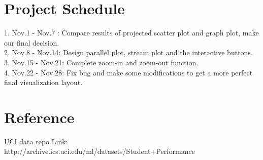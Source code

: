 \documentclass{article}
\begin{document}
\section{Project Schedule}
1. Nov.1 - Nov.7 : Compare results of projected scatter plot and graph plot, make our final decision.\\
2. Nov.8 - Nov.14: Design parallel plot,  stream plot and the interactive buttons.\\ 
3. Nov.15 - Nov.21: Complete zoom-in and zoom-out  function.\\
4. Nov.22 - Nov.28: Fix bug and make some modifications to get a more perfect final visualization layout.
\section{Reference}
UCI data repo Link: {http://archive.ics.uci.edu/ml/datasets/Student+Performance}
\end{document}
